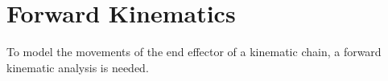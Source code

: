 \section{Forward Kinematics}

To model the movements of the end effector of a kinematic chain, a forward kinematic analysis is needed. 














